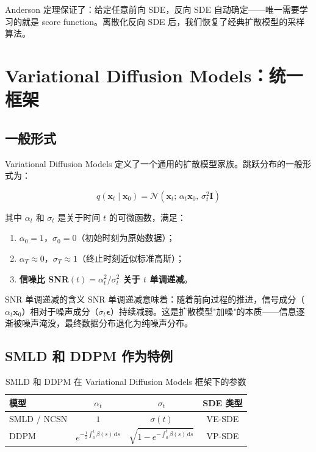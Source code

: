 \documentclass[a4paper]{article}
\begin{document}
Anderson 定理保证了：给定任意前向 SDE，反向 SDE 自动确定——唯一需要学习的就是 score function。离散化反向 SDE 后，我们恢复了经典扩散模型的采样算法。


\section{Variational Diffusion Models：统一框架}

\subsection{一般形式}

Variational Diffusion Models 定义了一个通用的扩散模型家族。跳跃分布的一般形式为：

$$
q(\mathbf{x}_t \mid \mathbf{x}_0) = \mathcal{N}\!\left(\mathbf{x}_t;\, \alpha_t \mathbf{x}_0,\, \sigma_t^2 \mathbf{I}\right)
$$

其中 $\alpha_t$ 和 $\sigma_t$ 是关于时间 $t$ 的可微函数，满足：

\begin{enumerate}
    \item $\alpha_0 = 1$，$\sigma_0 = 0$（初始时刻为原始数据）；
    \item $\alpha_T \approx 0$，$\sigma_T \approx 1$（终止时刻近似标准高斯）；
    \item \textbf{信噪比 SNR$(t) = \alpha_t^2/\sigma_t^2$ 关于 $t$ 单调递减}。
\end{enumerate}

\begin{importantbox}{SNR 单调递减的含义}
SNR 单调递减意味着：随着前向过程的推进，信号成分（$\alpha_t \mathbf{x}_0$）相对于噪声成分（$\sigma_t \boldsymbol{\epsilon}$）持续减弱。这是扩散模型"加噪"的本质——信息逐渐被噪声淹没，最终数据分布退化为纯噪声分布。
\end{importantbox}

\subsection{SMLD 和 DDPM 作为特例}

\begin{table}[H]
\centering
\begin{tabular}{lccc}
\toprule
\textbf{模型} & $\alpha_t$ & $\sigma_t$ & \textbf{SDE 类型} \\
\midrule
SMLD / NCSN & $1$ & $\sigma(t)$ & VE-SDE \\
DDPM & $e^{-\frac{1}{2}\int_0^t \beta(s)\,\mathrm{d}s}$ & $\sqrt{1 - e^{-\int_0^t \beta(s)\,\mathrm{d}s}}$ & VP-SDE \\
\bottomrule
\end{tabular}
\caption{SMLD 和 DDPM 在 Variational Diffusion Models 框架下的参数}
\end{table}
\end{document}
